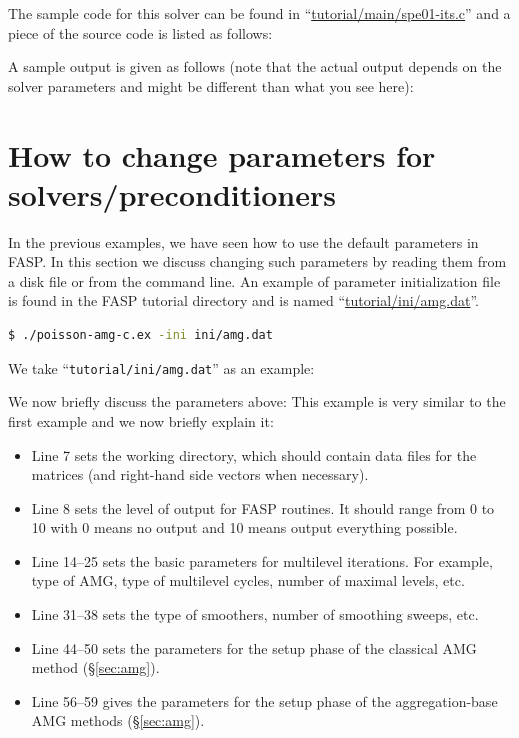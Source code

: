\documentclass[11pt]{memoir}
\begin{document}
The sample code for this solver can be found in ``\url{tutorial/main/spe01-its.c}'' and a piece of the source code is listed as follows:
%

%
A sample output is given as follows (note that the actual output depends on the solver parameters and might be different than what you see here):


\section{How to change parameters for
  solvers/preconditioners}\label{sec:parameters}

In the previous examples, we have seen how to use the default parameters in FASP. In this section we discuss changing such parameters
by reading them from a disk file or from the command line. An example of parameter initialization file is found in the FASP
tutorial directory and is named ``\url{tutorial/ini/amg.dat}''.
%
\begin{lstlisting}[numbers=none,language=sh]
$ ./poisson-amg-c.ex -ini ini/amg.dat
\end{lstlisting}
%
We take ``\verb|tutorial/ini/amg.dat|'' as an example:


We now briefly discuss the parameters above:
%
This example is very similar to the first example and we now briefly explain it:
\begin{itemize}
%
\item Line 7 sets the working directory, which should contain data files for the matrices (and right-hand side vectors when necessary).
%
\item Line 8 sets the level of output for FASP routines. It should range from 0 to 10 with 0 means no output and 10 means output everything possible.
%
\item Line 14--25 sets the basic parameters for multilevel iterations. For example, type of AMG, type of multilevel cycles, number of maximal levels, etc.
%
\item Line 31--38 sets the type of smoothers, number of smoothing sweeps, etc.
%
\item Line 44--50 sets the parameters for the setup phase of the classical AMG method (\S\ref{sec:amg}).
%
\item Line 56--59 gives the parameters for the setup phase of the aggregation-base AMG methods (\S\ref{sec:amg}).
%
\end{itemize}
%
\end{document}
